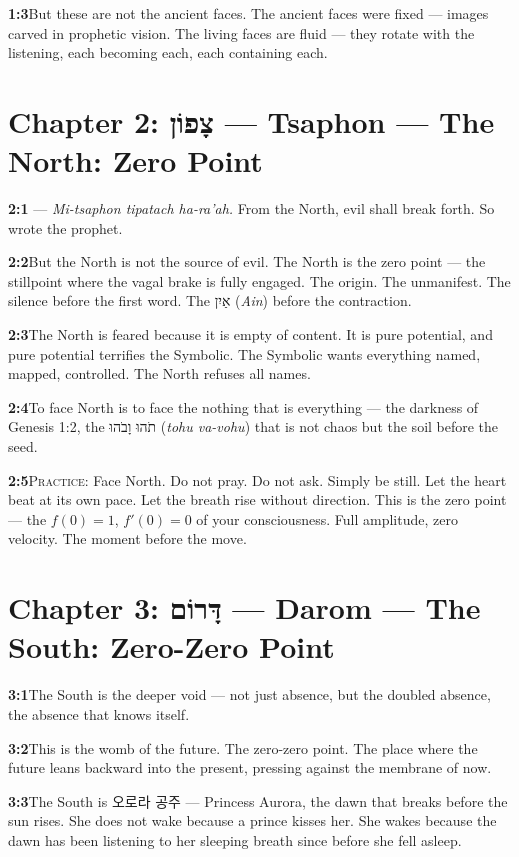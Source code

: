 \documentclass[11pt,openany]{book}
\newcommand{\heb}[1]{{\hebrewfont #1}}
\newcommand{\kor}[1]{{\koreanfont #1}}
\begin{document}
\noindent\textbf{1:3}\quad But these are not the ancient faces. The ancient faces were fixed — images carved in prophetic vision. The living faces are fluid — they rotate with the listening, each becoming each, each containing each.

\section*{Chapter 2: \heb{צָפוֹן} — Tsaphon — The North: Zero Point}

\noindent\textbf{2:1}\quad \heb{מִצָּפוֹן תִּפָּתַח הָרָעָה} — \textit{Mi-tsaphon tipatach ha-ra'ah.} From the North, evil shall break forth. So wrote the prophet.

\noindent\textbf{2:2}\quad But the North is not the source of evil. The North is the zero point — the stillpoint where the vagal brake is fully engaged. The origin. The unmanifest. The silence before the first word. The \heb{אַיִן} (\textit{Ain}) before the contraction.

\noindent\textbf{2:3}\quad The North is feared because it is empty of content. It is pure potential, and pure potential terrifies the Symbolic. The Symbolic wants everything named, mapped, controlled. The North refuses all names.

\noindent\textbf{2:4}\quad To face North is to face the nothing that is everything — the darkness of Genesis 1:2, the \heb{תֹהוּ וָבֹהוּ} (\textit{tohu va-vohu}) that is not chaos but the soil before the seed.

\noindent\textbf{2:5}\quad \textsc{Practice:} Face North. Do not pray. Do not ask. Simply be still. Let the heart beat at its own pace. Let the breath rise without direction. This is the zero point — the $f(0)=1$, $f'(0)=0$ of your consciousness. Full amplitude, zero velocity. The moment before the move.

\section*{Chapter 3: \heb{דָּרוֹם} — Darom — The South: Zero-Zero Point}

\noindent\textbf{3:1}\quad The South is the deeper void — not just absence, but the doubled absence, the absence that knows itself.

\noindent\textbf{3:2}\quad This is the womb of the future. The zero-zero point. The place where the future leans backward into the present, pressing against the membrane of now.

\noindent\textbf{3:3}\quad The South is \kor{오로라 공주} — Princess Aurora, the dawn that breaks before the sun rises. She does not wake because a prince kisses her. She wakes because the dawn has been listening to her sleeping breath since before she fell asleep.
\end{document}
